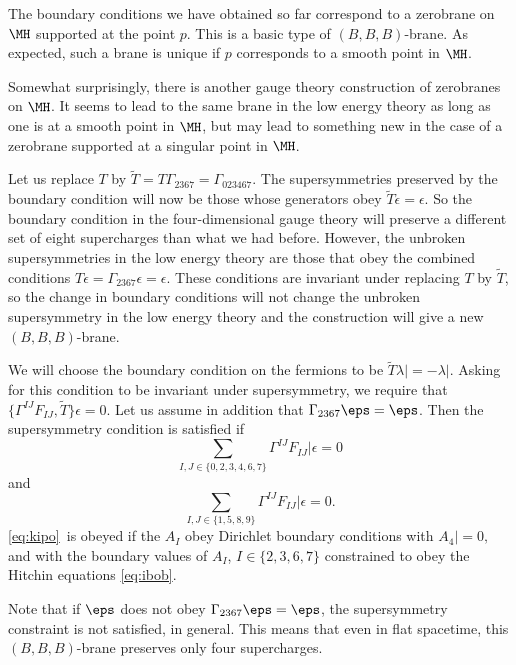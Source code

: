 The boundary conditions we have obtained so far correspond to a
zerobrane on $\MH$ supported at the point $p$.  This is a basic
type of $(B,B,B)$-brane.  As expected, such a brane is unique if
$p$ corresponds to a smooth point in $\MH$.

\par{}

Somewhat surprisingly, there is another gauge theory construction
of zerobranes on $\MH$.  It seems to lead to the same brane in the
low energy theory as long as one is at a smooth point in $\MH$,
but may lead to something new in the case of a zerobrane supported
at a singular point in $\MH$.

Let us replace $T$ by $\tilde T = T
\Gamma_{2367}=\Gamma_{023467}$. The supersymmetries preserved by
the boundary condition will now be those whose generators obey
$\tilde T\epsilon=\epsilon$.  So the boundary condition in the
four-dimensional gauge theory will preserve a different set of
eight supercharges than what we had before. However, the unbroken
supersymmetries in the low energy theory are those that obey the
combined conditions $T\epsilon=\Gamma_{2367}\epsilon=\epsilon$.
These conditions are invariant under replacing $T$ by $\tilde T$,
so the change in boundary conditions will not change the unbroken
supersymmetry in the low energy theory and the construction will
give a new $(B,B,B)$-brane.

We will choose the boundary condition on the fermions to be
$\tilde T\lambda\vert = -\lambda\vert$. Asking for this condition
to be invariant under supersymmetry, we require that
$\{\Gamma^{IJ}F_{IJ},\tilde T\}\epsilon=0$. Let us assume in
addition that $\Gamma_{2367}\eps=\eps$. Then the supersymmetry
condition is satisfied if %
\setcounter{equation}{16}
\begin{equation}\label{eq:kipo}
\sum_{I,J\in
\{0,2,3,4,6,7\}}\Gamma^{IJ}F_{IJ}\vert\epsilon=0
\end{equation}
 and
\setcounter{equation}{17}
\begin{equation}\label{eq:kipok}
\sum_{I,J\in
\{1,5,8,9\}}\Gamma^{IJ}F_{IJ}\vert\epsilon=0.
\end{equation}
 \eqref{eq:kipo}\ is obeyed if
the $A_I$ obey Dirichlet boundary conditions with $A_4\vert=0,$
and with the boundary values of $A_I$, $I\in \{2,3,6,7\}$
constrained to obey the Hitchin equations \eqref{eq:ibob}.

Note that if $\eps$ does not obey $\Gamma_{2367}\eps=\eps$, the
supersymmetry constraint is not satisfied, in general. This means
that even in flat spacetime, this $(B,B,B)$-brane  preserves only
four supercharges.

